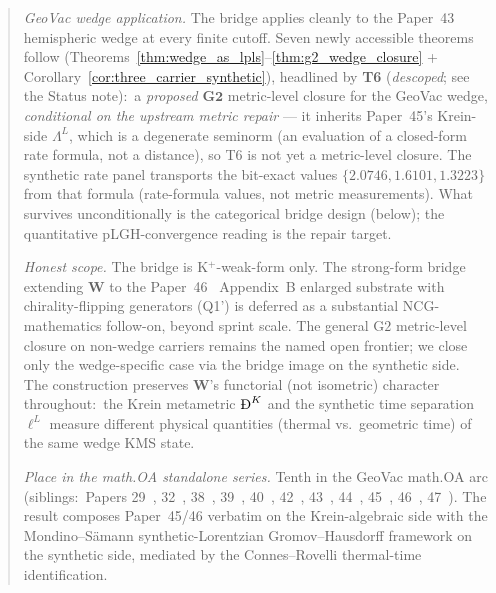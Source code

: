 \documentclass[11pt,a4paper]{article}
\theoremstyle{plain}
\theoremstyle{definition}
\newcommand{\Lprop}{\Lambda^{L}}
\newcommand{\BigDeth}{\text{\DJ}^{K}}
\newcommand{\Wfun}{\mathbf{W}}
\begin{document}
\begin{abstract}
\medskip

\noindent\emph{GeoVac wedge application.} The bridge applies cleanly
to the Paper~43~\cite{paper43} hemispheric wedge at every finite
cutoff. Seven newly accessible theorems follow
(Theorems~\ref{thm:wedge_as_lpls}--\ref{thm:g2_wedge_closure} +
Corollary~\ref{cor:three_carrier_synthetic}), headlined by
\textbf{T6} (\emph{descoped}; see the Status note):\ a \emph{proposed}
$\mathbf{G2}$ metric-level closure for the GeoVac wedge,
\emph{conditional on the upstream metric repair} --- it inherits
Paper~45's Krein-side $\Lprop$, which is a degenerate seminorm (an
evaluation of a closed-form rate formula, not a distance), so T6 is not
yet a metric-level closure. The synthetic rate panel transports the
bit-exact values $\{2.0746, 1.6101, 1.3223\}$ from that formula
(rate-formula values, not metric measurements). What survives
unconditionally is the categorical bridge design (below); the
quantitative pLGH-convergence reading is the repair target.

\medskip

\noindent\emph{Honest scope.} The bridge is K$^{+}$-weak-form only.
The strong-form bridge extending $\Wfun$ to the Paper~46~\cite{paper46}
Appendix~B enlarged substrate with chirality-flipping generators (Q1') is
deferred as a substantial NCG-mathematics follow-on, beyond sprint
scale. The general
$\mathrm{G2}$ metric-level closure on non-wedge carriers remains the
named open frontier; we close only the wedge-specific case via the
bridge image on the synthetic side. The construction preserves
$\Wfun$'s functorial (not isometric) character throughout:\ the Krein
metametric $\BigDeth$ and the synthetic time separation $\ell^{L}$
measure different physical quantities (thermal vs.\ geometric time) of
the same wedge KMS state.

\medskip

\noindent\emph{Place in the math.OA standalone series.} Tenth in the
GeoVac math.OA arc (siblings:\ Papers
29~\cite{paper29}, 32~\cite{paper32}, 38~\cite{paper38},
39~\cite{paper39}, 40~\cite{paper40_unified}, 42~\cite{paper42},
43~\cite{paper43}, 44~\cite{paper44}, 45~\cite{paper45},
46~\cite{paper46}, 47~\cite{paper47}). The result composes
Paper~45/46 verbatim on the Krein-algebraic side with the
Mondino--S\"amann synthetic-Lorentzian Gromov--Hausdorff framework on
the synthetic side, mediated by the Connes--Rovelli thermal-time
identification.
\end{abstract}
\end{document}
